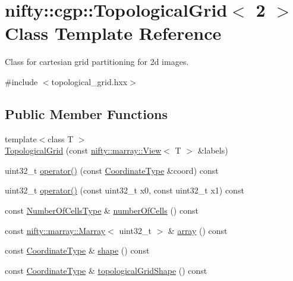 \hypertarget{classnifty_1_1cgp_1_1TopologicalGrid_3_012_01_4}{}\section{nifty\+:\+:cgp\+:\+:Topological\+Grid$<$ 2 $>$ Class Template Reference}
\label{classnifty_1_1cgp_1_1TopologicalGrid_3_012_01_4}


Class for cartesian grid partitioning for 2d images.  




{\ttfamily \#include $<$topological\+\_\+grid.\+hxx$>$}

\subsection*{Public Member Functions}
\begin{DoxyCompactItemize}
\item 
{\footnotesize template$<$class T $>$ }\\\hyperlink{classnifty_1_1cgp_1_1TopologicalGrid_3_012_01_4_a7f422c1535a4d760394676b59a1999fd}{Topological\+Grid} (const \hyperlink{classandres_1_1View}{nifty\+::marray\+::\+View}$<$ T $>$ \&labels)
\item 
uint32\+\_\+t \hyperlink{classnifty_1_1cgp_1_1TopologicalGrid_3_012_01_4_a905b1a26a828342bddbaa0d0a77c0d34}{operator()} (const \hyperlink{classnifty_1_1array_1_1ArrayExtender}{Coordinate\+Type} \&coord) const 
\item 
uint32\+\_\+t \hyperlink{classnifty_1_1cgp_1_1TopologicalGrid_3_012_01_4_a4d4dbb40b2ae833b665ecd75fa35a48c}{operator()} (const uint32\+\_\+t x0, const uint32\+\_\+t x1) const 
\item 
const \hyperlink{classnifty_1_1array_1_1ArrayExtender}{Number\+Of\+Cells\+Type} \& \hyperlink{classnifty_1_1cgp_1_1TopologicalGrid_3_012_01_4_a648f9643f45483ad552c47fc4e6f2474}{number\+Of\+Cells} () const 
\item 
const \hyperlink{classandres_1_1Marray}{nifty\+::marray\+::\+Marray}$<$ uint32\+\_\+t $>$ \& \hyperlink{classnifty_1_1cgp_1_1TopologicalGrid_3_012_01_4_ac373f5fc62653d42ec7528ab68c70617}{array} () const 
\item 
const \hyperlink{classnifty_1_1array_1_1ArrayExtender}{Coordinate\+Type} \& \hyperlink{classnifty_1_1cgp_1_1TopologicalGrid_3_012_01_4_a78ec31f8506769cfe025bfe75f4a15bb}{shape} () const 
\item 
const \hyperlink{classnifty_1_1array_1_1ArrayExtender}{Coordinate\+Type} \& \hyperlink{classnifty_1_1cgp_1_1TopologicalGrid_3_012_01_4_a865eb87e808b65cc9aed40730b87f0f9}{topological\+Grid\+Shape} () const 
\end{DoxyCompactItemize}


